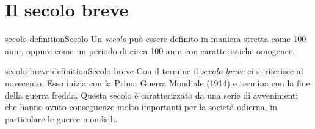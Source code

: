 \documentclass[preview]{standalone}
\begin{document}
\genpage

\section{Il secolo breve}

\begin{snippetdefinition}{secolo-definition}{Secolo}
    Un \textit{secolo} può essere definito in maniera stretta come 100 anni,
    oppure come un periodo di circa 100 anni con caratteristiche omogenee.
\end{snippetdefinition}

\begin{snippetdefinition}{secolo-breve-definition}{Secolo breve}
    Con il termine il \textit{secolo breve} ci si riferisce al novecento.
    Esso inizia con la Prima Guerra Mondiale (1914) e termina con la fine della guerra fredda.
    Questa secolo è caratterizzato da una serie di avvenimenti che hanno avuto conseguenze molto importanti
    per la società odierna, in particolare le guerre mondiali.
\end{snippetdefinition}
\end{document}
